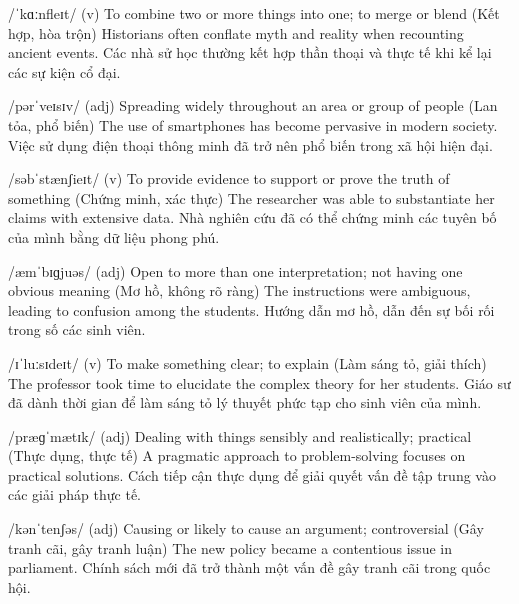 

{/ˈkɑːnfleɪt/ (v)}
{To combine two or more things into one; to merge or blend (Kết hợp, hòa trộn)}
{Historians often conflate myth and reality when recounting ancient events.}
{Các nhà sử học thường kết hợp thần thoại và thực tế khi kể lại các sự kiện cổ đại.}

{/pərˈveɪsɪv/ (adj)}
{Spreading widely throughout an area or group of people (Lan tỏa, phổ biến)}
{The use of smartphones has become pervasive in modern society.}
{Việc sử dụng điện thoại thông minh đã trở nên phổ biến trong xã hội hiện đại.}

{/səbˈstænʃieɪt/ (v)}
{To provide evidence to support or prove the truth of something (Chứng minh, xác thực)}
{The researcher was able to substantiate her claims with extensive data.}
{Nhà nghiên cứu đã có thể chứng minh các tuyên bố của mình bằng dữ liệu phong phú.}

{/æmˈbɪɡjuəs/ (adj)}
{Open to more than one interpretation; not having one obvious meaning (Mơ hồ, không rõ ràng)}
{The instructions were ambiguous, leading to confusion among the students.}
{Hướng dẫn mơ hồ, dẫn đến sự bối rối trong số các sinh viên.}

{/ɪˈluːsɪdeɪt/ (v)}
{To make something clear; to explain (Làm sáng tỏ, giải thích)}
{The professor took time to elucidate the complex theory for her students.}
{Giáo sư đã dành thời gian để làm sáng tỏ lý thuyết phức tạp cho sinh viên của mình.}

{/præɡˈmætɪk/ (adj)}
{Dealing with things sensibly and realistically; practical (Thực dụng, thực tế)}
{A pragmatic approach to problem-solving focuses on practical solutions.}
{Cách tiếp cận thực dụng để giải quyết vấn đề tập trung vào các giải pháp thực tế.}

{/kənˈtenʃəs/ (adj)}
{Causing or likely to cause an argument; controversial (Gây tranh cãi, gây tranh luận)}
{The new policy became a contentious issue in parliament.}
{Chính sách mới đã trở thành một vấn đề gây tranh cãi trong quốc hội.}

